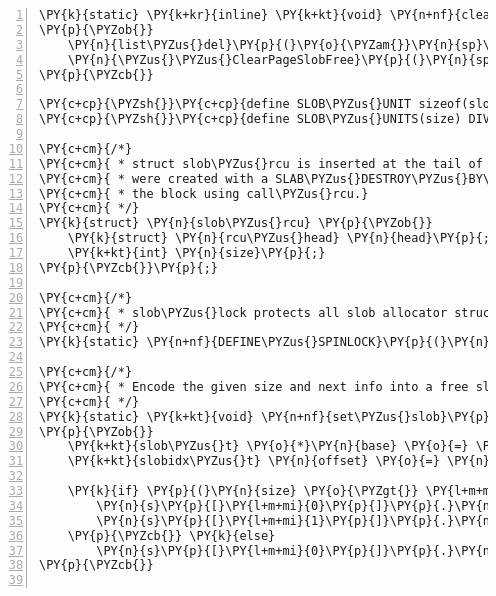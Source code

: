 \begin{Verbatim}[commandchars=\\\{\},numbers=left,firstnumber=1,stepnumber=1]
\PY{k}{static} \PY{k+kr}{inline} \PY{k+kt}{void} \PY{n+nf}{clear\PYZus{}slob\PYZus{}page\PYZus{}free}\PY{p}{(}\PY{k}{struct} \PY{n}{page} \PY{o}{*}\PY{n}{sp}\PY{p}{)}
\PY{p}{\PYZob{}}
	\PY{n}{list\PYZus{}del}\PY{p}{(}\PY{o}{\PYZam{}}\PY{n}{sp}\PY{o}{\PYZhy{}}\PY{o}{\PYZgt{}}\PY{n}{list}\PY{p}{)}\PY{p}{;}
	\PY{n}{\PYZus{}\PYZus{}ClearPageSlobFree}\PY{p}{(}\PY{n}{sp}\PY{p}{)}\PY{p}{;}
\PY{p}{\PYZcb{}}

\PY{c+cp}{\PYZsh{}}\PY{c+cp}{define SLOB\PYZus{}UNIT sizeof(slob\PYZus{}t)}
\PY{c+cp}{\PYZsh{}}\PY{c+cp}{define SLOB\PYZus{}UNITS(size) DIV\PYZus{}ROUND\PYZus{}UP(size, SLOB\PYZus{}UNIT)}

\PY{c+cm}{/*}
\PY{c+cm}{ * struct slob\PYZus{}rcu is inserted at the tail of allocated slob blocks, which}
\PY{c+cm}{ * were created with a SLAB\PYZus{}DESTROY\PYZus{}BY\PYZus{}RCU slab. slob\PYZus{}rcu is used to free}
\PY{c+cm}{ * the block using call\PYZus{}rcu.}
\PY{c+cm}{ */}
\PY{k}{struct} \PY{n}{slob\PYZus{}rcu} \PY{p}{\PYZob{}}
	\PY{k}{struct} \PY{n}{rcu\PYZus{}head} \PY{n}{head}\PY{p}{;}
	\PY{k+kt}{int} \PY{n}{size}\PY{p}{;}
\PY{p}{\PYZcb{}}\PY{p}{;}

\PY{c+cm}{/*}
\PY{c+cm}{ * slob\PYZus{}lock protects all slob allocator structures.}
\PY{c+cm}{ */}
\PY{k}{static} \PY{n+nf}{DEFINE\PYZus{}SPINLOCK}\PY{p}{(}\PY{n}{slob\PYZus{}lock}\PY{p}{)}\PY{p}{;}

\PY{c+cm}{/*}
\PY{c+cm}{ * Encode the given size and next info into a free slob block s.}
\PY{c+cm}{ */}
\PY{k}{static} \PY{k+kt}{void} \PY{n+nf}{set\PYZus{}slob}\PY{p}{(}\PY{k+kt}{slob\PYZus{}t} \PY{o}{*}\PY{n}{s}\PY{p}{,} \PY{k+kt}{slobidx\PYZus{}t} \PY{n}{size}\PY{p}{,} \PY{k+kt}{slob\PYZus{}t} \PY{o}{*}\PY{n}{next}\PY{p}{)}
\PY{p}{\PYZob{}}
	\PY{k+kt}{slob\PYZus{}t} \PY{o}{*}\PY{n}{base} \PY{o}{=} \PY{p}{(}\PY{k+kt}{slob\PYZus{}t} \PY{o}{*}\PY{p}{)}\PY{p}{(}\PY{p}{(}\PY{k+kt}{unsigned} \PY{k+kt}{long}\PY{p}{)}\PY{n}{s} \PY{o}{\PYZam{}} \PY{n}{PAGE\PYZus{}MASK}\PY{p}{)}\PY{p}{;}
	\PY{k+kt}{slobidx\PYZus{}t} \PY{n}{offset} \PY{o}{=} \PY{n}{next} \PY{o}{\PYZhy{}} \PY{n}{base}\PY{p}{;}

	\PY{k}{if} \PY{p}{(}\PY{n}{size} \PY{o}{\PYZgt{}} \PY{l+m+mi}{1}\PY{p}{)} \PY{p}{\PYZob{}}
		\PY{n}{s}\PY{p}{[}\PY{l+m+mi}{0}\PY{p}{]}\PY{p}{.}\PY{n}{units} \PY{o}{=} \PY{n}{size}\PY{p}{;}
		\PY{n}{s}\PY{p}{[}\PY{l+m+mi}{1}\PY{p}{]}\PY{p}{.}\PY{n}{units} \PY{o}{=} \PY{n}{offset}\PY{p}{;}
	\PY{p}{\PYZcb{}} \PY{k}{else}
		\PY{n}{s}\PY{p}{[}\PY{l+m+mi}{0}\PY{p}{]}\PY{p}{.}\PY{n}{units} \PY{o}{=} \PY{o}{\PYZhy{}}\PY{n}{offset}\PY{p}{;}
\PY{p}{\PYZcb{}}


\end{Verbatim}
